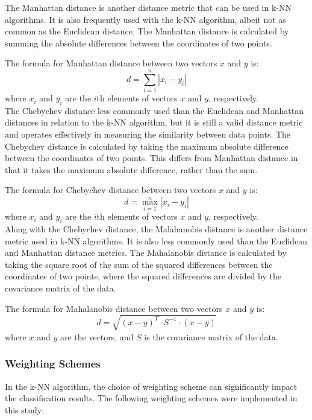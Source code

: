 The Manhattan distance is another distance metric that can be used in k-NN algorithms. It is also frequently used with the k-NN algorithm,
albeit not as common as the Euclidean distance.
The Manhattan distance is calculated by summing the absolute differences between the coordinates of two points.

The formula for Manhattan distance between two vectors \(x\) and \(y\) is:
\[ d = \sum_{i=1}^{n} |x_i - y_i| \]
where \(x_i\) and \(y_i\) are the \(i\)th elements of vectors \(x\) and \(y\), respectively.\\

The Chebychev distance less commonly used than the Euclidean and Manhattan distances
in relation to the k-NN algorithm, but it is still a valid distance metric and operates effectively in measuring the similarity between data points.
The Chebychev distance is calculated by taking the maximum absolute difference between the coordinates of two points. This differs from Manhattan distance
in that it takes the maximum absolute difference, rather than the sum.

The formula for Chebychev distance between two vectors \(x\) and \(y\) is:
\[ d = \max_{i=1}^{n} |x_i - y_i| \]
where \(x_i\) and \(y_i\) are the \(i\)th elements of vectors \(x\) and \(y\), respectively.\\

Along with the Chebychev distance, the Malahanobis distance is another distance metric used in k-NN algorithms.
It is also less commonly used than the Euclidean and Manhattan distance metrics.
The Mahalanobis distance is calculated by taking the square root of the sum of the squared differences between the coordinates of two points,
where the squared differences are divided by the covariance matrix of the data.

The formula for Mahalanobis distance between two vectors \(x\) and \(y\) is:
\[ d = \sqrt{(x - y)^T \cdot S^{-1} \cdot (x - y)} \]
where \(x\) and \(y\) are the vectors, and \(S\) is the covariance matrix of the data.\\

\subsubsection*{Weighting Schemes}
In the k-NN algorithm, the choice of weighting scheme can significantly impact the classification results.
The following weighting schemes were implemented in this study:\\

